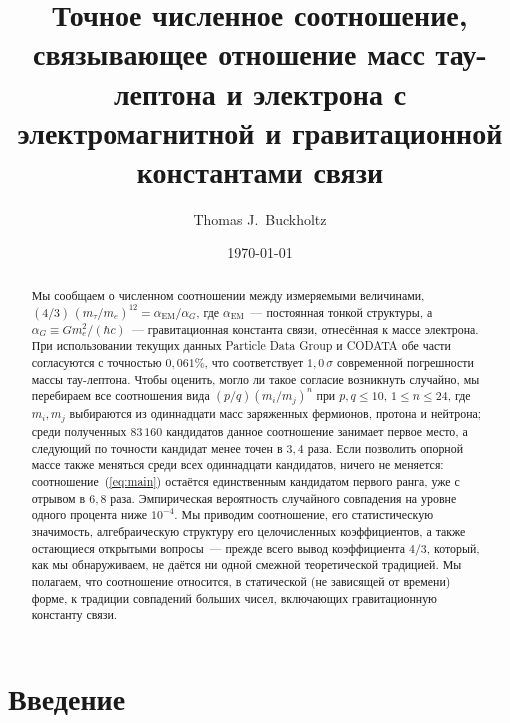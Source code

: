 \documentclass[aps,prd,twocolumn,amsmath,amssymb,floatfix,nofootinbib]{revtex4-2}
\begin{document}
\title{Точное численное соотношение, связывающее отношение масс
тау-лептона и электрона с электромагнитной и гравитационной
константами связи}

\author{Thomas J.\ Buckholtz}

\date{\today}

\begin{abstract}
Мы сообщаем о численном соотношении между измеряемыми величинами,
$(4/3)\,(m_\tau/m_e)^{12} = \alpha_{\mathrm{EM}}/\alpha_G$,
где $\alpha_{\mathrm{EM}}$~--- постоянная тонкой структуры, а
$\alpha_G \equiv G m_e^2/(\hbar c)$~--- гравитационная константа связи,
отнесённая к массе электрона. При использовании текущих данных Particle
Data Group и CODATA обе части согласуются с точностью $0{,}061\%$, что
соответствует $1{,}0\,\sigma$ современной погрешности массы тау-лептона.
Чтобы оценить, могло ли такое согласие возникнуть случайно, мы перебираем
все соотношения вида $(p/q)(m_i/m_j)^n$ при $p,q\le 10$, $1\le n\le 24$,
где $m_i,m_j$ выбираются из одиннадцати масс заряженных фермионов, протона
и нейтрона; среди полученных $83\,160$ кандидатов данное соотношение
занимает первое место, а следующий по точности кандидат менее точен в
$3{,}4$ раза. Если позволить опорной массе также меняться среди всех
одиннадцати кандидатов, ничего не меняется: соотношение~(\ref{eq:main})
остаётся единственным кандидатом первого ранга, уже с отрывом в $6{,}8$
раза. Эмпирическая вероятность случайного совпадения на уровне одного
процента ниже $10^{-4}$. Мы приводим соотношение, его статистическую
значимость, алгебраическую структуру его целочисленных коэффициентов, а
также остающиеся открытыми вопросы~--- прежде всего вывод коэффициента
$4/3$, который, как мы обнаруживаем, не даётся ни одной смежной
теоретической традицией. Мы полагаем, что соотношение относится, в
статической (не зависящей от времени) форме, к традиции совпадений больших
чисел, включающих гравитационную константу связи.
\end{abstract}

\maketitle

\section{Введение}
\end{document}
